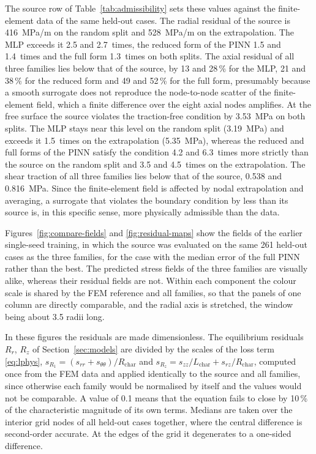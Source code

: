\documentclass[pdflatex,sn-basic,Numbered]{sn-jnl}
\begin{document}
The source row of Table~\ref{tab:admissibility} sets these values against the finite-element data of the same held-out cases. The radial residual of the source is 416~MPa/m on the random split and 528~MPa/m on the extrapolation. The MLP exceeds it 2.5 and 2.7~times, the reduced form of the PINN 1.5 and 1.4~times and the full form 1.3~times on both splits. The axial residual of all three families lies below that of the source, by 13 and 28\,\% for the MLP, 21 and 38\,\% for the reduced form and 49 and 52\,\% for the full form, presumably because a smooth surrogate does not reproduce the node-to-node scatter of the finite-element field, which a finite difference over the eight axial nodes amplifies. At the free surface the source violates the traction-free condition by 3.53~MPa on both splits. The MLP stays near this level on the random split (3.19~MPa) and exceeds it 1.5~times on the extrapolation (5.35~MPa), whereas the reduced and full forms of the PINN satisfy the condition 4.2 and 6.3~times more strictly than the source on the random split and 3.5 and 4.5~times on the extrapolation. The shear traction of all three families lies below that of the source, 0.538 and 0.816~MPa. Since the finite-element field is affected by nodal extrapolation and averaging, a surrogate that violates the boundary condition by less than its source is, in this specific sense, more physically admissible than the data.

Figures~\ref{fig:compare-fields} and \ref{fig:residual-maps} show the fields of the earlier single-seed training, in which the source was evaluated on the same 261 held-out cases as the three families, for the case with the median error of the full PINN rather than the best. The predicted stress fields of the three families are visually alike, whereas their residual fields are not. Within each component the colour scale is shared by the FEM reference and all families, so that the panels of one column are directly comparable, and the radial axis is stretched, the window being about 3.5 radii long.

In these figures the residuals are made dimensionless. The equilibrium residuals $R_r$, $R_z$ of Section~\ref{sec:models} are divided by the scales of the loss term \eqref{eq:lphys}, $s_{R_1}=(s_{rr}+s_{\theta\theta})/R_{\mathrm{char}}$ and $s_{R_z}=s_{zz}/L_{\mathrm{char}}+s_{rz}/R_{\mathrm{char}}$, computed once from the FEM data and applied identically to the source and all families, since otherwise each family would be normalised by itself and the values would not be comparable. A value of 0.1 means that the equation fails to close by 10\,\% of the characteristic magnitude of its own terms. Medians are taken over the interior grid nodes of all held-out cases together, where the central difference is second-order accurate. At the edges of the grid it degenerates to a one-sided difference.
\end{document}
